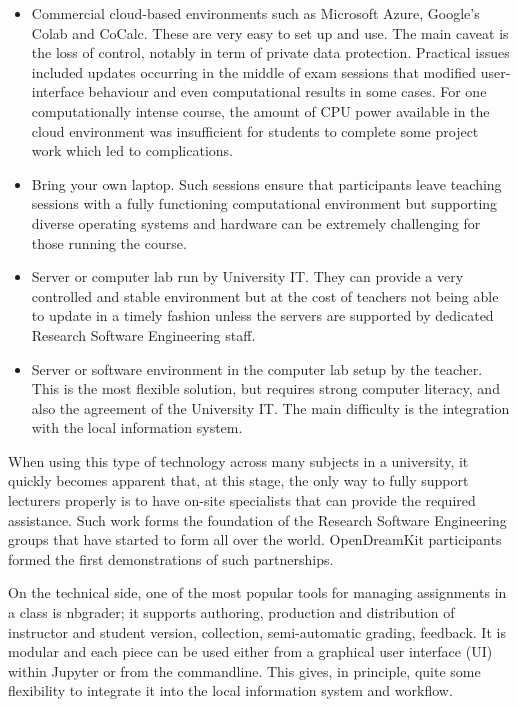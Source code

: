 \documentclass{deliverablereport}
\begin{document}
\begin{itemize}
\tightlist
\item Commercial cloud-based environments such as Microsoft Azure,
  Google's Colab and CoCalc. These are very easy to set up and use.
  The main caveat is the loss of control, notably in term of private
  data protection. Practical issues included updates occurring in the middle of exam
  sessions that modified user-interface behaviour and even computational
  results in some cases. For one computationally intense course, the
  amount of CPU power available in the cloud environment was
  insufficient for students to complete some project work which led to
  complications.
\item
  Bring your own laptop. Such sessions ensure that participants leave
  teaching sessions with a fully functioning computational environment
  but supporting diverse operating systems and hardware can be extremely
  challenging for those running the course.
\item Server or computer lab run by University IT. They can provide a
  very controlled and stable environment but at the cost of teachers
  not being able to update in a timely fashion unless the servers are
  supported by dedicated Research Software Engineering staff.
\item Server or software environment in the computer lab setup by the
  teacher. This is the most flexible solution, but requires strong
  computer literacy, and also the agreement of the University IT. The main
  difficulty is the integration with the local information system.
\end{itemize}

When using this type of technology across many subjects in a
university, it quickly becomes apparent that, at this stage, the only
way to fully support lecturers properly is to have on-site specialists
that can provide the required assistance. Such work forms the
foundation of the Research Software Engineering groups that have
started to form all over the world. OpenDreamKit participants formed
the first demonstrations of such partnerships.

On the technical side, one of the most popular tools for managing
assignments in a class is nbgrader; it supports authoring,
production and distribution of instructor and student version,
collection, semi-automatic grading, feedback. It is modular and each
piece can be used either from a graphical user interface (UI) within
Jupyter or from the commandline. This gives, in principle, quite some
flexibility to integrate it into the local information system and
workflow.
\end{document}
